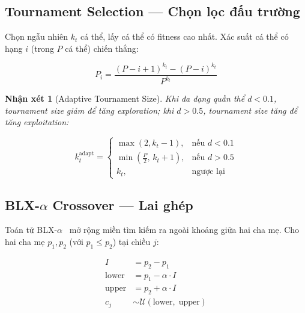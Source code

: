 \documentclass[12pt,a4paper]{article}
\newtheorem{remark}{Nhận xét}[section]
\begin{document}
\subsection{Tournament Selection --- Chọn lọc đấu trường}

Chọn ngẫu nhiên $k_t$ cá thể, lấy cá thể có fitness cao nhất. Xác suất cá thể
có hạng $i$ (trong $P$ cá thể) chiến thắng:

\begin{equation}
    P_i = \frac{(P - i + 1)^{k_t} - (P - i)^{k_t}}{P^{k_t}}
    \label{eq:tournament_prob}
\end{equation}

\begin{remark}[Adaptive Tournament Size]
Khi đa dạng quần thể $d < 0.1$, tournament size giảm để tăng exploration; khi
$d > 0.5$, tournament size tăng để tăng exploitation:

\begin{equation}
    k_t^{\text{adapt}} =
    \begin{cases}
        \max(2, k_t - 1), & \text{nếu } d < 0.1 \\
        \min\!\left(\frac{P}{2},\, k_t + 1\right), & \text{nếu } d > 0.5 \\
        k_t, & \text{ngược lại}
    \end{cases}
    \label{eq:adaptive_tournament}
\end{equation}
\end{remark}

\subsection{BLX-$\alpha$ Crossover --- Lai ghép}

Toán tử BLX-$\alpha$~\cite{eshelman1993real} mở rộng miền tìm kiếm ra ngoài
khoảng giữa hai cha mẹ. Cho hai cha mẹ $p_1, p_2$ (với $p_1 \leq p_2$)
tại chiều $j$:

\begin{equation}
    \boxed{
    \begin{aligned}
        I &= p_2 - p_1 \\
        \text{lower} &= p_1 - \alpha \cdot I \\
        \text{upper} &= p_2 + \alpha \cdot I \\
        c_j &\sim \mathcal{U}(\text{lower},\; \text{upper})
    \end{aligned}
    }
    \label{eq:blx_alpha}
\end{equation}
\end{document}
